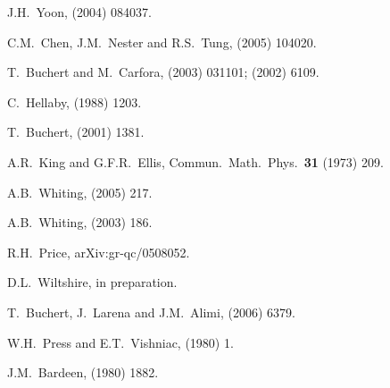\documentclass[12pt]{iopart}
\begin{document}
\begin{thebibliography}{66}
J.H.~Yoon,
 (2004) 084037.

C.M.~Chen, J.M.~Nester and R.S.~Tung,
 (2005) 104020. %

T.~Buchert and M.~Carfora,
 (2003) 031101; %
 (2002) 6109. %

C.~Hellaby,
 (1988) 1203.

T.~Buchert,
 (2001) 1381. %

A.R.~King and G.F.R.~Ellis,
Commun.\ Math.\ Phys.\ {\bf31} (1973) 209.

A.B.~Whiting,
 (2005) 217.

A.B.~Whiting,
 (2003) 186.

R.H.~Price,
arXiv:gr-qc/0508052.

D.L.~Wiltshire,
in preparation.

T.~Buchert, J.~Larena and J.M.~Alimi,
 (2006) 6379. %

W.H.~Press and E.T.~Vishniac,
 (1980) 1.

J.M.~Bardeen,
 (1980) 1882.


\end{thebibliography}
\end{document}
